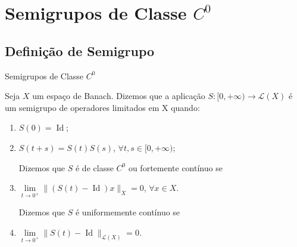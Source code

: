 \section{Semigrupos de Classe $C^0$}


\subsection*{Definição de Semigrupo}
\begin{frame}{Semigrupos de Classe $C^0$}
\begin{defin}
    Seja $X$ um espaço de Banach. Dizemos que a aplicação $S:[0,+\infty)\longrightarrow \mathcal{L}(X)$ é um {\color{blue} semigrupo de operadores limitados em X} quando:
\begin{enumerate}
    \item $S(0)=\operatorname{Id}$;
    \item $S(t+s)=S(t)S(s)$, $\forall t,s\in [0,+\infty)$;

Dizemos que $S$ é {\color{blue} de classe $C^0$ ou fortemente contínuo} se

    \item $\lim\limits_{t\to0^+} \|(S(t)-\operatorname{Id})x\|_{X}=0$, $\forall x\in X$.

Dizemos que $S$ é {\color{blue} uniformemente contínuo} se 

\item $\lim\limits_{t\to 0^+}\|S(t)-\operatorname{Id}\|_{\mathcal{L}(X)}=0$.
\end{enumerate}
\end{defin}
\end{frame}

